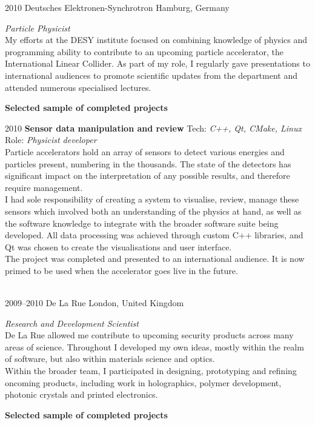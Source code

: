 \documentclass[]{friggeri-cv} %
\begin{document}
\begin{entrylist}
\entry
{2010}
{\LARGE{Deutsches Elektronen-Synchrotron}}
{Hamburg, Germany}
{\emph{Particle Physicist} \\
My efforts at the DESY  institute focused on combining knowledge of physics and programming ability to contribute to an upcoming particle accelerator, the International Linear Collider. As part of my role, I regularly gave presentations to international audiences to promote scientific updates from the department and attended numerous specialised lectures. \\
\centerline{\textbf{Selected sample of completed projects}}} 

\entry
{2010}
{\textbf{Sensor data manipulation and review}}
{}
{Tech: \emph{C++, Qt, CMake, Linux} \hfill Role: \emph{Physicist developer} \\
Particle accelerators hold an array of sensors to detect various energies and particles present, numbering in the thousands. The state of the detectors has significant impact on the interpretation of any possible results, and therefore require management.\\
I had sole responsibility of creating a system to visualise, review, manage these sensors which involved both an understanding of the physics at hand, as well as the software knowledge to integrate with the broader software suite being developed. All data processing was achieved through custom C++ libraries, and Qt was chosen to create the visualisations and user interface.\\
The project was completed and presented to an international audience. It is now primed to be used when the accelerator goes live in the future.
}

\\
\entry
{2009--2010}
{\LARGE{De La Rue}}
{London, United Kingdom}
{\emph{Research and Development Scientist} \\
De La Rue allowed me contribute to upcoming security
products across many areas of science. Throughout I developed my own ideas, mostly within the realm of software, but also within materials science and optics. \\
Within the broader team, I participated in designing, prototyping and refining oncoming products, including  work in holographics, polymer development, photonic crystals and printed electronics. \\
\centerline{\textbf{Selected sample of completed projects}}}


\end{entrylist}
\end{document}
